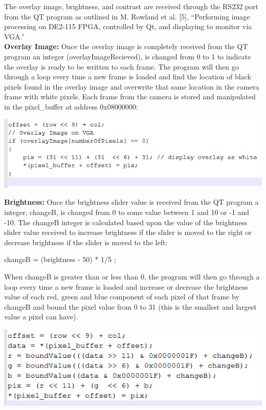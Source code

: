 \documentclass{article}
\newenvironment{Figure}
  {\par\medskip\noindent\ignorespaces\minipage{\linewidth}}
  {\endminipage\par\medskip}
\begin{document}
\begin{multicols*}{2}
The overlay image, brightness, and contrast are received through the RS232 port from the QT program as outlined in M. Rowland et al. [5], “Performing image processing on DE2-115 FPGA, controlled by Qt, and displaying to monitor via VGA.”\\

{\bf  Overlay Image: }
Once the overlay image is completely received from the QT program an integer (overlayImageRecieved), is changed from 0 to 1 to indicate the overlay is ready to be written to each frame. The program will then go through a loop every time a new frame is loaded and find the location of  black pixels found in the overlay image and overwrite that same location in the camera frame with white pixels. Each frame from the camera is stored and manipulated in the pixel\_buffer at address 0x08000000:

\begin{Figure}
 \centering
 \includegraphics[width=\linewidth]{ccode2.png}
\end{Figure}

{\bf  Brightness: }
Once the brightness slider value is received from the QT program a integer, changeB, is changed from 0 to some value between 1 and 10 or -1 and -10. The changeB integer is calculated based upon the value of the brightness slider value received to increase brightness if the slider is moved to the right or decrease brightness if the slider is moved to the left:

changeB = (brightness - 50)  * 1/5 ;

When changeB is greater than or less than 0, the program will then go through a loop every time a new frame is loaded and increase or decrease the brightness value of each red, green and blue component of each pixel of that frame by changeB and bound the pixel value from 0 to 31 (this is the smallest and largest value a pixel can have).	

\begin{Figure}
 \centering
 \includegraphics[width=\linewidth]{ccode3.png}
\end{Figure}


\end{multicols*}
\end{document}
